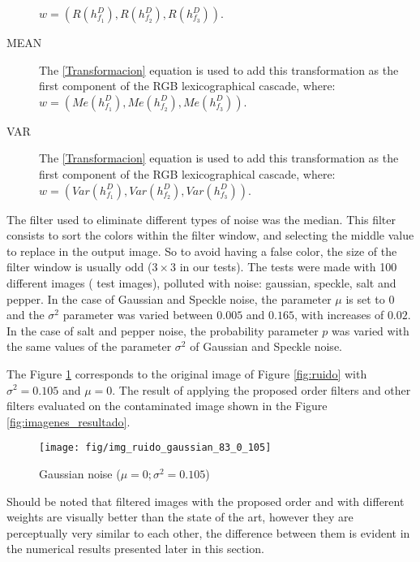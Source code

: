 \begin{description}
$w = (R(h_{f_1}^D), R(h_{f_2}^D), R(h_{f_3}^D))$.
	\item [MEAN] The \ref{Transformacion} equation is used to add this transformation as the first component of the RGB lexicographical cascade, where:\\ 
$w = (Me(h_{f_1}^D), Me(h_{f_2}^D), Me(h_{f_3}^D))$.
	\item [VAR] The \ref{Transformacion} equation is used to add this transformation as the first component of the RGB lexicographical cascade, where:\\ 
$w = (Var(h_{f_1}^D), Var(h_{f_2}^D), Var(h_{f_3}^D))$.
\end{description}

The filter used to eliminate different types of noise was the median. This filter consists to sort the colors within the filter window, and selecting the middle value to replace in the output image. So to avoid having a false color, the size of the filter window is usually odd ($3\times 3$ in our tests). The tests were made with 100 different images (\cite{arbelaez2007berkeley} test images), polluted with noise: gaussian, speckle, salt and pepper. In the case of Gaussian and Speckle noise, the parameter $\mu$ is set to $0$ and the $\sigma^2$ parameter was varied between $0.005$ and $0.165$, with increases of $0.02$. In the case of salt and pepper noise, the probability parameter $p$ was varied with the same values of the parameter $\sigma^2$ of Gaussian and Speckle noise.

The Figure \ref{fig:imagen_ejemplo_ruido_gaussiano} corresponds to the original image of Figure \ref{fig:ruido} with $\sigma^2 = 0.105$ and $\mu = 0$. The result of applying the proposed order filters and other filters evaluated on the contaminated image shown in the Figure \ref{fig:imagenes_resultado}.

\begin{figure}
	\centering
	\texttt{[image: fig/img\_ruido\_gaussian\_83\_0\_105]}
	\caption{Gaussian noise ($\mu = 0; \sigma^2 = 0.105$)}
	\label{fig:imagen_ejemplo_ruido_gaussiano}
\end{figure}

Should be noted that filtered images with the proposed order and with different weights are visually better than the state of the art, however they are perceptually very similar to each other, the difference between them is evident in the numerical results presented later in this section.

